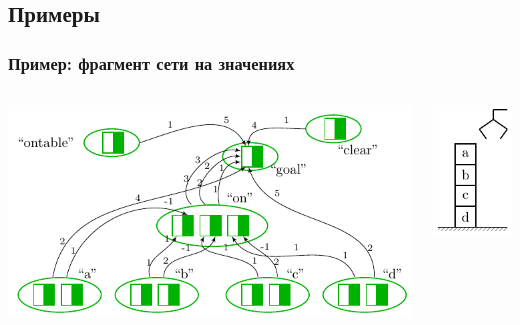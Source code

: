 \documentclass[default]{beamer}
\begin{document}
	\subsection{Примеры}
	\begin{frame}
		\frametitle{Пример: фрагмент сети на значениях}
		\begin{columns}
			\begin{column}{0.7\textwidth}
				\centering
				\includegraphics[page=2,width=\textwidth]{plan/plan_nets}
			\end{column}
			\begin{column}{0.3\textwidth}
				\centering
				\includegraphics[page=1,width=\textwidth]{plan/block_world}

\end{column}
\end{columns}
\end{frame}
\end{document}
